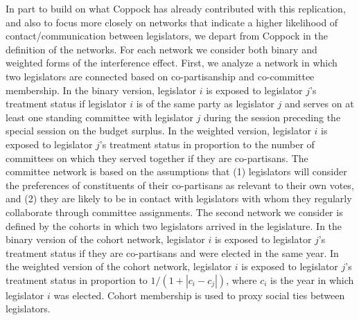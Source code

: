 \documentclass[12pt]{article}
\begin{document}
In part to build on what Coppock has already contributed with this replication, and also to focus more closely on networks that indicate a higher likelihood of contact/communication between legislators, we depart from Coppock in the definition of the networks. For each network we consider both binary and weighted forms of the interference effect. First, we analyze a network in which two legislators are connected based on co-partisanship and co-committee membership. In the binary version, legislator $i$ is exposed to legislator $j$'s treatment status if legislator $i$ is of the same party as legislator $j$ and serves on at least one standing committee with legislator $j$ during the session preceding the special session on the budget surplus. In the weighted version, legislator $i$ is exposed to legislator $j$'s treatment status in proportion to the number of committees on which they served together if they are co-partisans. The committee network is based on the assumptions that (1) legislators will consider the preferences of constituents of their co-partisans as relevant to their own votes, and (2) they are likely to be in contact with legislators with whom they regularly collaborate through committee assignments. The second network we consider is defined by the cohorts in which two legislators arrived in the legislature. In the binary version of the cohort network, legislator $i$ is exposed to legislator $j$'s treatment status if they are co-partisans and were elected in the same year. In the weighted version of the cohort network, legislator $i$ is exposed to legislator $j$'s treatment status in proportion to $1/(1+|c_i-c_j|)$, where $c_i$ is the year in which legislator $i$ was elected. Cohort membership is used to proxy social ties between legislators.  
\end{document}
